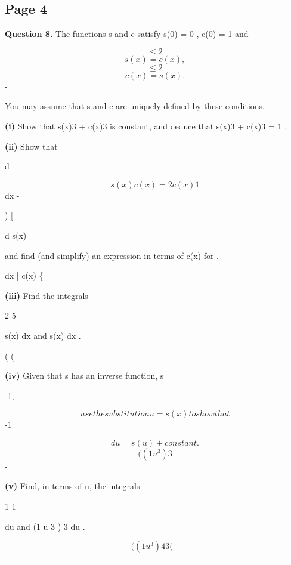 \documentclass[12pt]{article}
\begin{document}
\subsection*{Page 4}
\begin{flushleft}
\bigskip\textbf{Question 8.} The functions s and c satisfy s(0) = 0 , c(0) = 1 and\par
\[\leq 2\]
\[s (x) = c(x) ,\]
\[\leq 2\]
\[c (x) = s(x) .\]
-\par
You may assume that s and c are uniquely defined by these conditions.\par
\textbf{(i)} Show that s(x)3 + c(x)3 is constant, and deduce that s(x)3 + c(x)3 = 1 .\par
\textbf{(ii)} Show that\par
d\par
\[s(x)c(x) = 2c(x) 1\]
dx -\par
) [\par
d s(x)\par
and find (and simplify) an expression in terms of c(x) for .\par
dx ] c(x) \{\par
\textbf{(iii)} Find the integrals\par
2 5\par
s(x) dx and s(x) dx .\par
( (\par
\textbf{(iv)} Given that s has an inverse function, s\par
-1,\par
\[use the substitution u = s(x) to show that\]
-1\par
\[du = s (u) + constant.\]
\[( (1 u^3) 3\]
-\par
\textbf{(v)} Find, in terms of u, the integrals\par
1 1\par
du and (1 u 3 ) 3 du .\par
\[( (1 u^3) 4 3 ( -\]
-\par
\end{flushleft}
\end{document}

